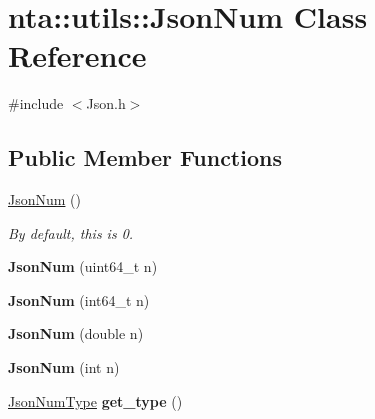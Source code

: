 \hypertarget{classnta_1_1utils_1_1JsonNum}{}\section{nta\+:\+:utils\+:\+:Json\+Num Class Reference}
\label{classnta_1_1utils_1_1JsonNum}


{\ttfamily \#include $<$Json.\+h$>$}

\subsection*{Public Member Functions}
\begin{DoxyCompactItemize}
\item 
\mbox{\label{classnta_1_1utils_1_1JsonNum_a4c16668854577689d9ae6e6a9f7fd62d}} 
\hyperlink{classnta_1_1utils_1_1JsonNum_a4c16668854577689d9ae6e6a9f7fd62d}{Json\+Num} ()
\begin{DoxyCompactList}\small\item\em By default, this is 0. \end{DoxyCompactList}\item 
\mbox{\label{classnta_1_1utils_1_1JsonNum_a2a17dbe70a84cd8d202b6ad5b865ec28}} 
{\bfseries Json\+Num} (uint64\+\_\+t n)
\item 
\mbox{\label{classnta_1_1utils_1_1JsonNum_a30dcf42823f7d99800c2eac63fdd8026}} 
{\bfseries Json\+Num} (int64\+\_\+t n)
\item 
\mbox{\label{classnta_1_1utils_1_1JsonNum_a94ecf5200ab6caa555850d96441dae29}} 
{\bfseries Json\+Num} (double n)
\item 
\mbox{\label{classnta_1_1utils_1_1JsonNum_ae4cd0552c7196301f7adf62394ad7e0c}} 
{\bfseries Json\+Num} (int n)
\item 
\mbox{\label{classnta_1_1utils_1_1JsonNum_a9df08dcba9a39706221cd215a295f16c}} 
\hyperlink{namespacenta_1_1utils_a83ee7c4cfccd9fa43564f5fe1c0c77d3}{Json\+Num\+Type} {\bfseries get\+\_\+type} ()
\item 
\mbox{\label{classnta_1_1utils_1_1JsonNum_a89e8033a247c3342d99a762f6110d877}} 

\end{DoxyCompactItemize}
